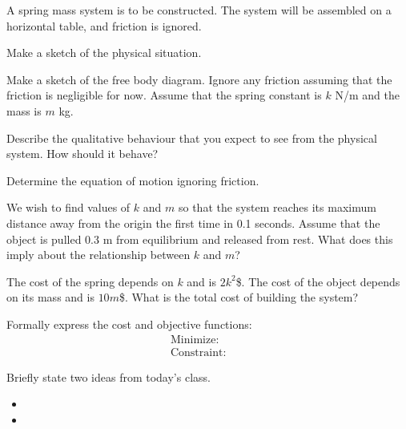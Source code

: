 \begin{problem}
\item A spring mass system is to be constructed. The system will be
  assembled on a horizontal table, and friction is ignored. 
  \begin{subproblem}
    \item Make a sketch of the physical situation.
      \vfill
    \item Make a sketch of the free body diagram. Ignore any friction
      assuming that the friction is negligible for now. Assume that
      the spring constant is $k$ N/m and the mass is $m$ kg.
      \vfill
    \item Describe the qualitative behaviour that you expect to see
      from the physical system. How should it behave?
      \vfill
    \item Determine the equation of motion ignoring friction.
      \vfill
  \end{subproblem}

  \clearpage

\item We wish to find values of $k$ and $m$ so that the system reaches
  its maximum distance away from the origin the first time in 0.1
  seconds. Assume that the object is pulled 0.3 m from equilibrium and
  released from rest. What does this imply about the relationship
  between $k$ and $m$?
  \vfill

  \clearpage

\item The cost of the spring depends on $k$ and is $2k^2$\$. The cost
  of the object depends on its mass and is $10m$\$. What is the total
  cost of building the system?

  \vfill

\item Formally express the cost and objective functions:
    \begin{eqnarray*}
      \mathrm{Minimize:} & &  \\
      \mathrm{Constraint:} & & 
    \end{eqnarray*}



\end{problem}

\begin{problem}
\item 
  \begin{subproblem}
    \item
  \end{subproblem}
\end{problem}

\postClass

\begin{problem}
\item Briefly state two ideas from today's class.
  \begin{itemize}
  \item 
  \item 
  \end{itemize}
\item 
  \begin{subproblem}
    \item
  \end{subproblem}
\end{problem}





